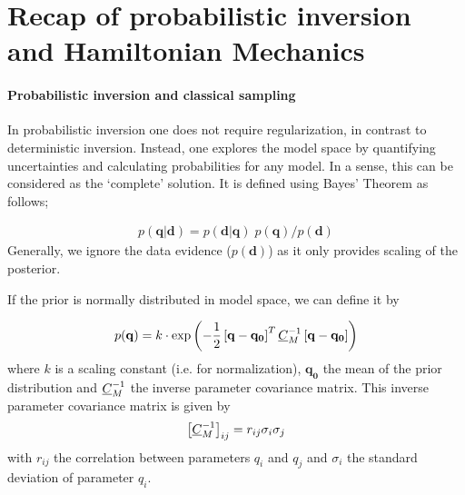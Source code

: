\section{Recap of probabilistic inversion and Hamiltonian Mechanics}

\paragraph{Probabilistic inversion and classical sampling}
In probabilistic inversion one does not require regularization, in contrast to deterministic inversion. Instead, one explores the model space by quantifying uncertainties and calculating probabilities for any model. In a sense, this can be considered as the `complete' solution. It is defined using Bayes' Theorem as follows;

\begin{gather}
	p(\mathbf{q}|\mathbf{d}) = p(\mathbf{d}|\mathbf{q})\;p(\mathbf{q}) / p(\mathbf{d})
\end{gather}
Generally, we ignore the data evidence ($p(\mathbf{d})$) as it only provides scaling of the posterior.

If the prior is normally distributed in model space, we can define it by

\begin{gather}
	p(\mathbf{q}) = k \cdot \exp{\left( -\frac{1}{2} \left[ \mathbf{q} -\mathbf{q_0}\right]^T \ensuremath{\underline{C}}_M ^{-1}\left[ \mathbf{q} -  \mathbf{q_0}\right]\right)}
\end{gather}
where $k$ is a scaling constant (i.e. for normalization), $\mathbf{q_0}$ the mean of the prior distribution and $\underline{C}_M ^{-1}$ the inverse parameter covariance matrix. This inverse parameter covariance matrix is given by
\begin{gather}
	\left[ \underline{C}_M^{-1} \right]_{ij} = r_{ij} \sigma_i \sigma_j
\end{gather}
with $r_{ij}$ the correlation between parameters $q_i$ and $q_j$ and $\sigma_i$ the standard deviation of parameter $q_i$.

